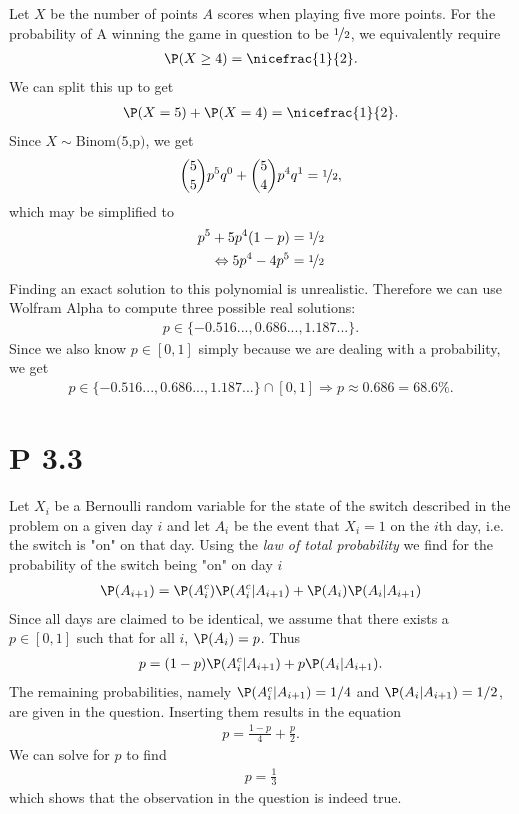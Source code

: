 \documentclass{article}
\begin{document}
Let $X$ be the number of points $A$ scores when playing five more points.
For the probability of A winning the game in question
to be $\nicefrac{1}{2}$, we equivalently require
\begin{align*}
  \P(X\geq 4) = \nicefrac{1}{2}.
\end{align*}
We can split this up to get
\begin{align*}
  \P(X = 5) + \P(X = 4) = \nicefrac{1}{2}.
\end{align*}
Since $X\sim\text{Binom(5,p)}$, we get
\begin{align*}
  \binom{5}{5}p^5q^0+\binom{5}{4}p^4q^1=\nicefrac{1}{2},
\end{align*}
which may be simplified to
\begin{align*}
  p^5+5p^4(1-p) &= \nicefrac{1}{2}\\
  \Leftrightarrow 5p^4-4p^5&=\nicefrac{1}{2}
\end{align*}
Finding an exact solution to this polynomial is unrealistic.
Therefore we can use Wolfram Alpha to compute three possible real solutions:
\begin{align*}
  p \in \{-0.516..., 0.686..., 1.187...\}.
\end{align*}
Since we also know $p\in[0,1]$ simply because we are dealing with a
probability, we get
\begin{align*}
  p\in \{-0.516..., 0.686..., 1.187...\} \cap [0,1] \Rightarrow p \approx 0.686=68.6\%.
\end{align*}


\section*{P 3.3}


Let $X_i$ be a Bernoulli random variable for the state of the switch described in the
problem on a given day $i$ and let $A_i$ be the event that $X_i=1$ on the $i$th day, 
i.e. the switch is "on" on that day. 
Using the \emph{law of total probability} we find for the probability of the switch 
being "on" on day $i$
\begin{align*}
  \P(A_{i+1}) = \P(A^c_i)\P(A^c_i | A_{i+1}) + \P(A_i)\P(A_i|A_{i+1})
\end{align*}
Since all days are claimed to be 
identical, we assume that there exists a $p\in[0,1]$ such that for all $i$,
$\P(A_i)=p$. Thus
\begin{align*}
  p = (1-p)\P(A^c_i|A_{i+1}) + p\P(A_i|A_{i+1}).
\end{align*}
The remaining probabilities, namely $\P(A^c_i|A_{i+1})=1/4$ and $\P(A_i|A_{i+1})=1/2$, 
are given in the question. Inserting them results in the equation
\begin{align*}
  p=\frac{1-p}{4} + \frac{p}{2}.
\end{align*}
We can solve for $p$ to find 
\begin{align*}
  p=\frac{1}{3}
\end{align*}
which shows that the observation in the question is indeed true.
\end{document}
